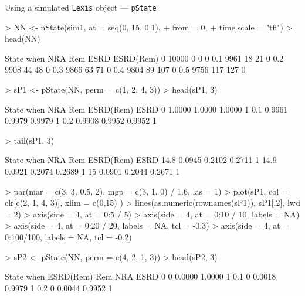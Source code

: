 \begin{frame}{Using a simulated \texttt{Lexis} object --- \texttt{pState}}
\begin{Schunk}
\begin{Sinput}
> NN <- nState(sim1, at = seq(0, 15, 0.1),
+                  from = 0,
+            time.scale = "tfi")
> head(NN)
\end{Sinput}
\begin{Soutput}
     State
when    NRA   Rem  ESRD ESRD(Rem)
  0   10000     0     0         0
  0.1  9961    18    21         0
  0.2  9908    44    48         0
  0.3  9866    63    71         0
  0.4  9804    89   107         0
  0.5  9756   117   127         0
\end{Soutput}
\begin{Sinput}
> sP1 <- pState(NN, perm = c(1, 2, 4, 3))
> head(sP1, 3)
\end{Sinput}
\begin{Soutput}
     State
when     NRA    Rem ESRD(Rem) ESRD
  0   1.0000 1.0000    1.0000    1
  0.1 0.9961 0.9979    0.9979    1
  0.2 0.9908 0.9952    0.9952    1
\end{Soutput}
\begin{Sinput}
> tail(sP1, 3)
\end{Sinput}
\begin{Soutput}
      State
when      NRA    Rem ESRD(Rem) ESRD
  14.8 0.0945 0.2102    0.2711    1
  14.9 0.0921 0.2074    0.2689    1
  15   0.0901 0.2044    0.2671    1
\end{Soutput}
\begin{Sinput}
> par(mar = c(3, 3, 0.5, 2), mgp = c(3, 1, 0) / 1.6, las = 1)
> plot(sP1, col = clr[c(2, 1, 4, 3)], xlim = c(0,15) )
> lines(as.numeric(rownames(sP1)), sP1[,2], lwd = 2)
> axis(side = 4, at = 0:5 / 5)
> axis(side = 4, at = 0:10 / 10, labels = NA)
> axis(side = 4, at = 0:20 / 20, labels = NA, tcl = -0.3)
> axis(side = 4, at = 0:100/100, labels = NA, tcl = -0.2)
\end{Sinput}
\end{Schunk}
\begin{Schunk}
\begin{Sinput}
> sP2 <- pState(NN, perm = c(4, 2, 1, 3))
> head(sP2, 3)
\end{Sinput}
\begin{Soutput}
     State
when  ESRD(Rem)    Rem    NRA ESRD
  0           0 0.0000 1.0000    1
  0.1         0 0.0018 0.9979    1
  0.2         0 0.0044 0.9952    1

\end{Soutput}
\end{Schunk}
\end{frame}
